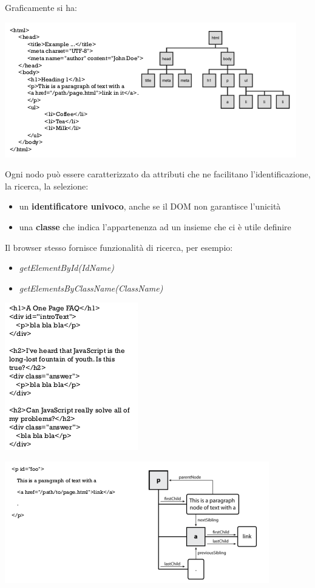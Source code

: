 \documentclass[a4paper,12pt, oneside]{book}
\begin{document}
Graficamente si ha:
\begin{center}
\includegraphics[scale=0.9]{img/dom.png}
\end{center}
\newpage
Ogni nodo può essere caratterizzato da
attributi che ne facilitano l'identificazione, la ricerca, la selezione:
\begin{itemize}
\item un \textbf{identificatore univoco}, anche se il DOM non garantisce l'unicità
\item una \textbf{classe} che indica l'appartenenza ad
un insieme che ci è utile definire
\end{itemize}
Il browser stesso fornisce funzionalità di ricerca, per esempio:
\begin{itemize}
\item \textit{getElementById(IdName)}
\item \textit{getElementsByClassName(ClassName)}
\end{itemize}
\begin{center}
\includegraphics[scale=2.9]{img/dom2.png}
\end{center}
\begin{center}
\includegraphics[scale=0.9]{img/dom3.png}
\end{center}
\end{document}
